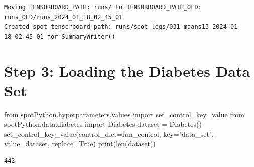 \documentclass[
  letterpaper,
  DIV=11,
  numbers=noendperiod]{scrreprt}
\newenvironment{Shaded}{\begin{snugshade}}{\end{snugshade}}
\newcommand{\BuiltInTok}[1]{\textcolor[rgb]{0.00,0.23,0.31}{#1}}
\newcommand{\ImportTok}[1]{\textcolor[rgb]{0.00,0.46,0.62}{#1}}
\newcommand{\NormalTok}[1]{\textcolor[rgb]{0.00,0.23,0.31}{#1}}
\newcommand{\OperatorTok}[1]{\textcolor[rgb]{0.37,0.37,0.37}{#1}}
\newcommand{\StringTok}[1]{\textcolor[rgb]{0.13,0.47,0.30}{#1}}
\newcommand{\VariableTok}[1]{\textcolor[rgb]{0.07,0.07,0.07}{#1}}
\begin{document}
\begin{verbatim}
Moving TENSORBOARD_PATH: runs/ to TENSORBOARD_PATH_OLD: runs_OLD/runs_2024_01_18_02_45_01
Created spot_tensorboard_path: runs/spot_logs/031_maans13_2024-01-18_02-45-01 for SummaryWriter()
\end{verbatim}

\section{Step 3: Loading the Diabetes Data
Set}\label{step-3-loading-the-diabetes-data-set}

\begin{Shaded}
\begin{Highlighting}[]
\ImportTok{from}\NormalTok{ spotPython.hyperparameters.values }\ImportTok{import}\NormalTok{ set\_control\_key\_value}
\ImportTok{from}\NormalTok{ spotPython.data.diabetes }\ImportTok{import}\NormalTok{ Diabetes}
\NormalTok{dataset }\OperatorTok{=}\NormalTok{ Diabetes()}
\NormalTok{set\_control\_key\_value(control\_dict}\OperatorTok{=}\NormalTok{fun\_control,}
\NormalTok{                        key}\OperatorTok{=}\StringTok{"data\_set"}\NormalTok{,}
\NormalTok{                        value}\OperatorTok{=}\NormalTok{dataset,}
\NormalTok{                        replace}\OperatorTok{=}\VariableTok{True}\NormalTok{)}
\BuiltInTok{print}\NormalTok{(}\BuiltInTok{len}\NormalTok{(dataset))}
\end{Highlighting}
\end{Shaded}

\begin{verbatim}
442
\end{verbatim}
\end{document}

